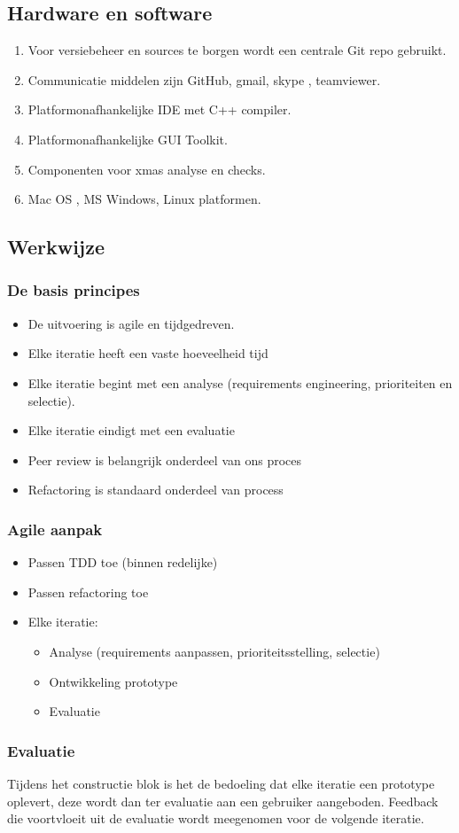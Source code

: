 \subsection{Hardware en software}
\begin{enumerate}
	\item Voor versiebeheer en sources te borgen wordt een centrale Git repo gebruikt.
	\item Communicatie middelen zijn GitHub, gmail, skype , teamviewer.
	\item Platformonafhankelijke IDE met C++ compiler.
	\item Platformonafhankelijke GUI Toolkit.
	\item Componenten voor xmas analyse en checks.
	\item Mac OS , MS Windows, Linux platformen.
\end{enumerate}


\subsection{Werkwijze}
\subsubsection{De basis principes}
\begin{itemize}
 \item De uitvoering is agile en tijdgedreven.
 \item Elke iteratie heeft een vaste hoeveelheid tijd
 \item Elke iteratie begint met een analyse (requirements engineering, prioriteiten en selectie).     \item Elke iteratie eindigt met een evaluatie
\item Peer review is belangrijk onderdeel van ons proces
 \item Refactoring is standaard onderdeel van process
\end{itemize}

\subsubsection{Agile aanpak}
\begin{itemize}
 \item Passen TDD toe (binnen redelijke)
 \item Passen refactoring toe
 \item Elke iteratie:
 \begin{itemize}
   \item Analyse (requirements aanpassen, prioriteitsstelling, selectie)
   \item Ontwikkeling prototype
   \item Evaluatie
 \end{itemize}
\end{itemize}

\subsubsection{Evaluatie}
Tijdens het constructie blok is het de bedoeling dat elke iteratie een prototype oplevert, deze wordt dan ter evaluatie aan een gebruiker aangeboden. Feedback die voortvloeit uit de evaluatie wordt meegenomen voor de volgende iteratie.




